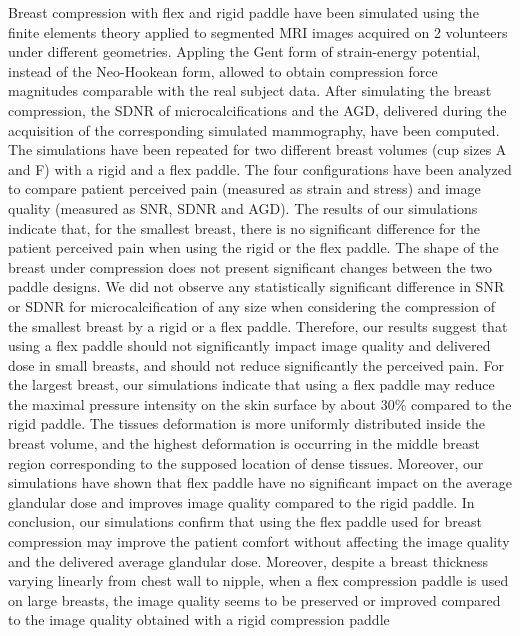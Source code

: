 Breast compression with flex and rigid paddle have been simulated using the finite elements theory applied to segmented MRI images acquired on 2 volunteers under different geometries. Appling the Gent form of strain-energy potential, instead of the Neo-Hookean form, allowed to obtain compression force magnitudes comparable with the real subject data.  
After simulating the breast compression, the SDNR of microcalcifications and the AGD, delivered during the acquisition of the corresponding simulated mammography, have been computed. The simulations have been repeated for two different breast volumes (cup sizes A and F) with a rigid and a flex paddle. The four configurations have been analyzed to compare patient perceived pain (measured as strain and stress) and image quality (measured as SNR, SDNR and AGD). The results of our simulations indicate that, for the smallest breast, there is no significant difference for the patient perceived pain when using the rigid or the flex paddle. The shape of the breast under compression does not present significant changes between the two paddle designs. We did not observe any statistically significant difference in SNR or SDNR for microcalcification of any size when considering the compression of the smallest breast by a rigid or a flex paddle. Therefore, our results suggest that using a flex paddle should not significantly impact image quality and delivered dose in small breasts, and should not reduce significantly the perceived pain.   
For the largest breast, our simulations indicate that using a flex paddle may reduce the maximal pressure intensity on the skin surface by about 30\% compared to the rigid paddle. The tissues deformation is more uniformly distributed inside the breast volume, and the highest deformation is occurring in the middle breast region corresponding to the supposed location of dense tissues. Moreover, our simulations have shown that flex paddle have no significant impact on the average glandular dose and improves image quality compared to the rigid paddle. 
In conclusion, our simulations confirm that using the flex paddle used for breast compression may improve the patient comfort without affecting the image quality and the delivered average glandular dose. Moreover, despite a breast thickness varying linearly from chest wall to nipple, when a flex compression paddle is used on large breasts, the image quality seems to be preserved or improved compared to the image quality obtained with a rigid compression paddle
